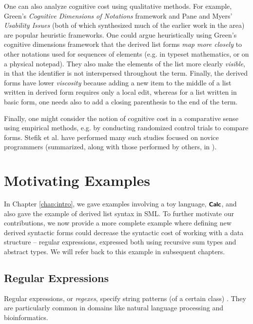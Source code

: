 One can also analyze cognitive cost using qualitative methods. For example, Green's \emph{Cognitive Dimensions of Notations} \cite{Green89,green1996usability} framework and Pane and Myers' \emph{Usability Issues} \cite{pane1996usability} (both of which synthesized much of the earlier work in the area) are popular heuristic frameworks. One could argue heuristically using Green's cognitive dimensions framework that the derived list forms \emph{map more closely} to other notations used for sequences of elements (e.g. in typeset mathematics, or on a physical notepad). They also make the elements of the list more clearly \emph{visible}, in that the identifier  is not interspersed throughout the term. Finally, the derived forms have lower \emph{viscosity} because adding a new item to the middle of a list written in derived form requires only a local edit, whereas for a list written in basic form, one needs also to add a closing parenthesis to the end of the term.

Finally, one might consider the notion of cognitive cost in a comparative sense using empirical methods, e.g. by conducting randomized control trials to compare forms. Stefik et al. have performed many such studies focused on novice programmers (summarized, along with those performed by others, in \cite{journals/jeric/StefikS13}). 



\section{Motivating Examples}\label{sec:motivating-examples}
In Chapter \ref{chap:intro}, we gave examples involving a toy language, $\textsf{\textbf{\small Calc}}$, and also gave the example of derived list syntax in SML. To further motivate our contributions, we now provide a more complete  example where defining new derived syntactic forms could  decrease the syntactic cost of working with a data structure -- regular expressions, expressed both using recursive sum types and abstract types. We will refer back to this example in subsequent chapters.%

\subsection{Regular Expressions}\label{sec:syntax-examples-regexps}
Regular expressions, or \emph{regexes}, specify string patterns (of a certain class) \cite{Thompson:1968:PTR:363347.363387}. They are particularly common in domains like natural language processing and bioinformatics.

